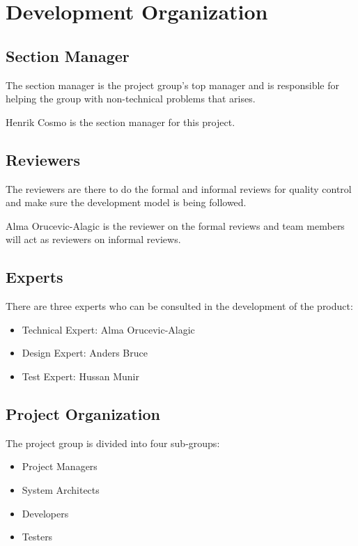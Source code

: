 \documentclass[a4paper]{article}
\begin{document}
\section{Development Organization}

\subsection{Section Manager}
The section manager is the project group's top manager and is responsible for helping the group with non-technical problems that arises.

Henrik Cosmo is the section manager for this project.

\subsection{Reviewers}
The reviewers are there to do the formal and informal reviews for quality control and make sure the development model is being followed.

Alma Orucevic-Alagic is the reviewer on the formal reviews and team members will act as reviewers on informal reviews.

\subsection{Experts}
There are three experts who can be consulted in the development of the product:
\begin{itemize}
\item Technical Expert: Alma Orucevic-Alagic
\item Design Expert: Anders Bruce
\item Test Expert: Hussan Munir
\end{itemize}

\subsection{Project Organization}

The project group is divided into four sub-groups:
\begin{itemize}
\item Project Managers
\item System Architects
\item Developers
\item Testers
\end{itemize}
\end{document}
